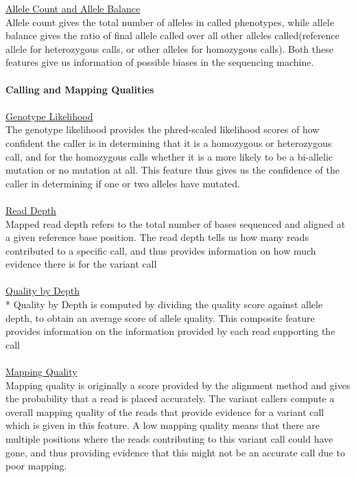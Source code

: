 \documentclass{article}
\begin{document}
\underline{Allele Count and Allele Balance}\\
Allele count gives the total number of alleles in called phenotypes, while allele balance gives the ratio of final allele called over all other alleles called(reference allele for heterozygous calls, or other alleles for homozygous calls). Both these features give us information of possible biases in the sequencing machine.\\\\
\textbf{Calling and Mapping Qualities} \\\\
\underline{Genotype Likelihood}\\
The genotype likelihood provides the phred-scaled likelihood scores of how confident the caller is in determining that it is a homozygous or heterozygous call, and for the homozygous calls whether it is a more likely to be a bi-allelic mutation or no mutation at all. This feature thus gives us the confidence of the caller in determining if one or two alleles have mutated. \\\\ 
\underline{Read Depth}\\
Mapped read depth refers to the total number of bases sequenced and aligned at a given reference base position. The read depth tells us how many reads contributed to a specific call, and thus provides information on how much evidence there is for the variant call\\\\
\underline{Quality by Depth}\\*
Quality by Depth is computed by dividing the quality score against allele depth, to obtain an average score of allele quality. This composite feature provides information on the information provided by each read supporting the call\\\\
\underline{Mapping Quality}\\
Mapping quality is originally a score provided by the alignment method and gives the probability that a read is placed accurately. The variant callers compute a overall mapping quality of the reads that provide evidence for a variant call which is given in this feature. A low mapping quality means that there are multiple positions where the reads contributing to this variant call could have gone, and thus providing evidence that this might not be an accurate call due to poor mapping.\\\\
\newpage
\end{document}
